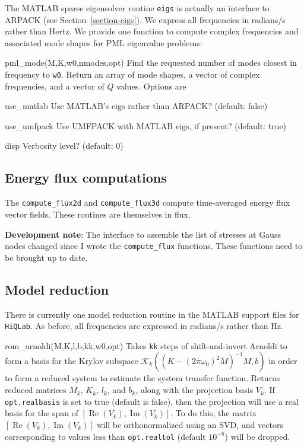 \documentclass{article}
\newcommand{\hiq}{\texttt{HiQLab}}
\newcommand{\devnote}[1]{%
  \begin{trivlist}
  \item\textbf{Development note}: #1
  \end{trivlist}}
\newenvironment{codelist}[1][\quad]%
  {\begin{list}{}{%
   \settowidth{\labelwidth}{\texttt{#1}\hfil}%
   \setlength{\leftmargin}{\labelwidth}%
   \addtolength{\leftmargin}{\labelsep}%
   \addtolength{\leftmargin}{\parindent}%
   \renewcommand{\makelabel}[1]{\texttt{##1}}}}%
  {\end{list}}
\newcommand{\ttt}[1]{\texttt{#1}}
\renewcommand{\Re}{\operatorname{Re}}
\renewcommand{\Im}{\operatorname{Im}}
\begin{document}
The MATLAB sparse eigensolver routine \ttt{eigs} is actually an
interface to ARPACK (see Section~\ref{section-eigs}).  We express all
frequencies in radians/s rather than Hertz.  We provide one function
to compute complex frequencies and associated mode shapes for PML
eigenvalue problems:
\begin{codelist}

  \item[pml\_mode(M,K,w0,nmodes,opt)]
    Find the requested number of modes closest in frequency to
    \ttt{w0}.  Return an array of mode shapes, a vector of complex
    frequencies, and a vector of $Q$ values.  Options are 
    \begin{codelist}[use\_umfpack]
      \item[use\_matlab]  Use MATLAB's eigs rather than ARPACK?
      (default: false)
      \item[use\_umfpack]  Use UMFPACK with MATLAB eigs, if present?
      (default: true)
      \item[disp]  Verbosity level? (default: 0)
    \end{codelist}

\end{codelist}


\subsection{Energy flux computations}

The \ttt{compute\_flux2d} and \ttt{compute\_flux3d} compute
time-averaged energy flux vector fields.  These routines are
themselves in flux.

\devnote{The interface to assemble the list of stresses at Gauss nodes
  changed since I wrote the \ttt{compute\_flux} functions.  These
  functions need to be brought up to date.}


\subsection{Model reduction}

There is currently one model reduction routine in the MATLAB support
files for \hiq.  As before, all frequencies are expressed in radians/s
rather than Hz.
\begin{codelist}

  \item[rom\_arnoldi(M,K,l,b,kk,w0,opt)] Takes \ttt{kk} steps of
    shift-and-invert Arnoldi to form a basis for the Krylov subspace
    $\mathcal{K}_k\left( (K-(2 \pi \omega_0)^2 M)^{-1} M, b \right)$
    in order to form a reduced system to estimate the system transfer
    function.  Returns reduced matrices $M_k$, $K_k$, $l_k$, and
    $b_k$, along with the projection basis $V_k$.  If
    \ttt{opt.realbasis} is set to true (default is false), then the
    projection will use a real basis for the span of $[\Re(V_k),
    \Im(V_k)]$.  To do this, the matrix $[\Re(V_k), \Im(V_k)]$ will be
    orthonormalized using an SVD, and vectors corresponding to values
    less than \ttt{opt.realtol} (default $10^{-8}$) will be dropped.

\end{codelist}
\end{document}
